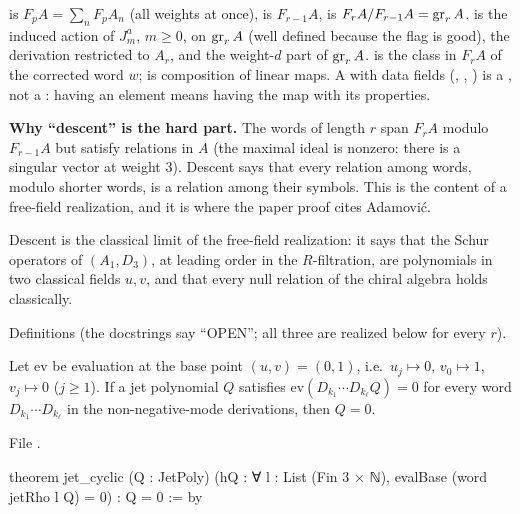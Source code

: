 \begin{dictionary}
 is $F_pA=\sum_n F_pA_n$ (all weights at once),  is $F_{r-1}A$,  is $F_rA/F_{r-1}A=\operatorname{gr}_rA$.
 is the induced action of $J^a_m$, $m\ge0$, on $\operatorname{gr}_rA$ (well defined because the flag is good), 
the derivation restricted to $A_r$, and  the weight-$d$ part of $\operatorname{gr}_rA$.  is the class in $F_rA$ of the
corrected word $w$;  is composition of linear maps. A  with data fields (, , ) is a , not a
: having an element means having the map with its properties.

\textbf{Why ``descent'' is the hard part.} The words of length $r$ span $F_rA$ modulo $F_{r-1}A$ but satisfy relations in $A$ (the maximal ideal is
nonzero: there is a singular vector at weight $3$). Descent says that every relation among words, modulo shorter words, is a relation among their
symbols. This is the content of a free-field realization, and it is where the paper proof cites Adamović.
\end{dictionary}

\begin{physics}
Descent is the classical limit of the free-field realization: it says that the Schur operators of $(A_1,D_3)$, at leading order in the $R$-filtration,
are polynomials in two classical fields $u,v$, and that every null relation of the chiral algebra holds classically.
\end{physics}

\begin{status}
Definitions (the docstrings say ``OPEN''; all three are realized below for every $r$).
\end{status}

\begin{theorem}\label{l28:thm:jetcyclic}
Let $\mathrm{ev}$ be evaluation at the base point $(u,v)=(0,1)$, i.e.\ $u_j\mapsto0$, $v_0\mapsto1$, $v_j\mapsto0$ ($j\ge1$). If a jet polynomial $Q$ satisfies
$\mathrm{ev}(D_{k_1}\cdots D_{k_\ell}Q)=0$ for every word $D_{k_1}\cdots D_{k_\ell}$ in the non-negative-mode derivations, then $Q=0$.
\end{theorem}

\noindent File .
\begin{leancode}
theorem jet_cyclic (Q : JetPoly)
    (hQ : ∀ l : List (Fin 3 × ℕ), evalBase (word jetRho l Q) = 0) : Q = 0 := by
\end{leancode}

